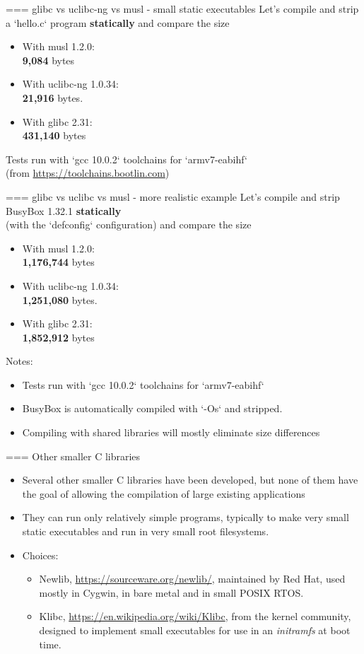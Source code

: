 === {glibc vs uclibc-ng vs musl - small static executables}
  Let's compile and strip a `hello.c` program {\bf statically} and compare the size
  \begin{itemize}
    \item With musl 1.2.0:\\
          {\bf 9,084} bytes
    \item With uclibc-ng 1.0.34:\\
          {\bf 21,916} bytes.
    \item With glibc 2.31:\\
          {\bf 431,140} bytes
  \end{itemize}
  Tests run with `gcc 10.0.2` toolchains for `armv7-eabihf`\\
  (from \url{https://toolchains.bootlin.com})


=== {glibc vs uclibc vs musl - more realistic example}
  Let's compile and strip BusyBox 1.32.1 {\bf statically}\\
  (with the `defconfig` configuration) and compare the size
  \begin{itemize}
    \item With musl 1.2.0:\\
          {\bf 1,176,744} bytes
    \item With uclibc-ng 1.0.34:\\
          {\bf 1,251,080} bytes.\\
    \item With glibc 2.31:\\
          {\bf 1,852,912} bytes
  \end{itemize}
  Notes:
  \begin{itemize}
    \item Tests run with `gcc 10.0.2` toolchains for `armv7-eabihf`
    \item BusyBox is automatically compiled with `-Os` and stripped.
    \item Compiling with shared libraries will mostly eliminate size differences
  \end{itemize}


=== Other smaller C libraries
  \begin{itemize}
  \item Several other smaller C libraries have been developed, but
    none of them have the goal of allowing the compilation of large
    existing applications
  \item They can run only relatively simple programs,
	typically to make very small static executables and run
	in very small root filesystems.
  \item Choices:
    \begin{itemize}
    \item Newlib, \url{https://sourceware.org/newlib/},
	  maintained by Red Hat, used mostly in Cygwin, in bare metal
          and in small POSIX RTOS.
    \item Klibc, \url{https://en.wikipedia.org/wiki/Klibc},
          from the kernel community, designed to implement small executables
          for use in an {\em initramfs} at boot time.
    \end{itemize}
  \end{itemize}


